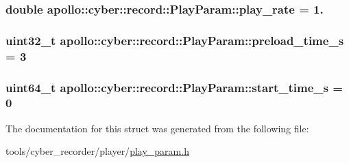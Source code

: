\hypertarget{structapollo_1_1cyber_1_1record_1_1PlayParam_ae04dbf5694326031dad9969da95d21d7}{
\subsubsection[{play\-\_\-rate}]{\setlength{\rightskip}{0pt plus 5cm}double apollo\-::cyber\-::record\-::\-Play\-Param\-::play\-\_\-rate = 1.}}\label{structapollo_1_1cyber_1_1record_1_1PlayParam_ae04dbf5694326031dad9969da95d21d7}
\hypertarget{structapollo_1_1cyber_1_1record_1_1PlayParam_a91947975bc9f81a3191e0f288ef8daea}{
\subsubsection[{preload\-\_\-time\-\_\-s}]{\setlength{\rightskip}{0pt plus 5cm}uint32\-\_\-t apollo\-::cyber\-::record\-::\-Play\-Param\-::preload\-\_\-time\-\_\-s = 3}}\label{structapollo_1_1cyber_1_1record_1_1PlayParam_a91947975bc9f81a3191e0f288ef8daea}
\hypertarget{structapollo_1_1cyber_1_1record_1_1PlayParam_ad47628af7a81f39cf99e5a91e07920b7}{
\subsubsection[{start\-\_\-time\-\_\-s}]{\setlength{\rightskip}{0pt plus 5cm}uint64\-\_\-t apollo\-::cyber\-::record\-::\-Play\-Param\-::start\-\_\-time\-\_\-s = 0}}\label{structapollo_1_1cyber_1_1record_1_1PlayParam_ad47628af7a81f39cf99e5a91e07920b7}


The documentation for this struct was generated from the following file\-:\begin{DoxyCompactItemize}
\item 
tools/cyber\-\_\-recorder/player/\hyperlink{play__param_8h}{play\-\_\-param.\-h}\end{DoxyCompactItemize}
